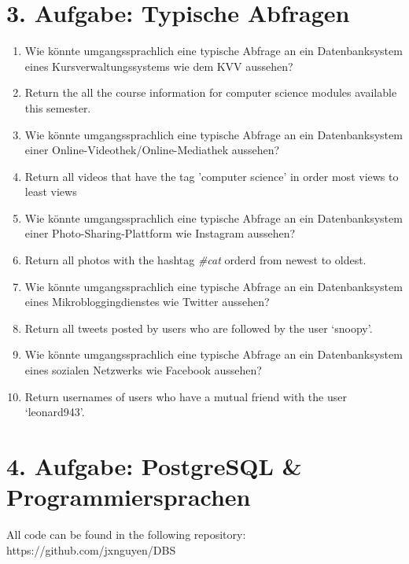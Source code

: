 \documentclass[12pt]{report}
\newcommand{\answer}{\textbf{A:}}
\begin{document}
\newpage

\section*{3. Aufgabe: Typische Abfragen}

\begin{enumerate}
\item[(2 P)] Wie könnte umgangssprachlich eine typische Abfrage an ein Datenbanksystem eines Kursverwaltungssystems wie dem KVV aussehen?
\item[\answer]
  Return the all the course information for computer science modules available this semester.

\item[(2 P)] Wie könnte umgangssprachlich eine typische Abfrage an ein Datenbanksystem einer Online-Videothek/Online-Mediathek aussehen?
\item[\answer]
  Return all videos that have the tag 'computer science' in order most views to least views

\item[(2 P)] Wie könnte umgangssprachlich eine typische Abfrage an ein Datenbanksystem einer Photo-Sharing-Plattform wie Instagram aussehen?
\item[\answer]
  Return all photos with the hashtag \textit{\#cat} orderd from newest to oldest.

\item[(2 P)] Wie könnte umgangssprachlich eine typische Abfrage an ein Datenbanksystem eines Mikrobloggingdienstes wie Twitter aussehen?
\item[\answer]
  Return all tweets posted by users who are followed by the user `snoopy'.

\item[(2 P)] Wie könnte umgangssprachlich eine typische Abfrage an ein Datenbanksystem eines sozialen Netzwerks wie Facebook aussehen?
\item[\answer]
  Return usernames of users who have a mutual friend with the user `leonard943'.
\end{enumerate}

\newpage

\section*{4. Aufgabe: PostgreSQL \& Programmiersprachen}

\vspace{1cm}
All code can be found in the following repository: https://github.com/jxnguyen/DBS\\
\end{document}
